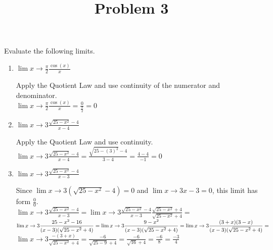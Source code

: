 \documentclass{ximera}
\title[Problem 3]{Problem 3}
\begin{document}
\begin{abstract} \end{abstract}
\maketitle


\begin{problem}
Evaluate the following limits.
	\begin{enumerate}
		\item $ \displaystyle \lim{x \to \frac{\pi}{2}} \frac{\cos{(x)}}{x}  $
	\begin{explanation} Apply the Quotient Law and use continuity of the numerator and denominator.\\[1em]
	 $ \displaystyle \lim{x \to \frac{\pi}{2}} \frac{\cos{(x)}}{x}=\frac{0}{\frac{\pi}{2}}=0  $
	\end{explanation} 
		
	\item	$\displaystyle \lim{x \to 3} \frac{\sqrt{25-x^2 }-4}{x-4} $\\
	\begin{explanation}Apply the Quotient Law and use continuity.	\\[1em]
	 $ \displaystyle \lim{x \to 3} \frac{\sqrt{25-x^2 }-4}{x-4}=  \frac{\sqrt{25-(3)^2 }-4}{3-4}= \frac{4-4}{-1}=0$\\
	
	\end{explanation} 
	\item	$\displaystyle \lim{x \to 3} \frac{\sqrt{25-x^2 }-4}{x-3} $\\
	\begin{explanation}
	Since $\displaystyle \lim{x \to 3} (\sqrt{25-x^2 }-4) = 0$ and $\displaystyle \lim{x \to 3} {x-3} = 0$, this limit has form $\frac{0}{0}$.\\[1em]
	 $ \displaystyle \lim{x \to 3} \frac{\sqrt{25-x^2 }-4}{x-3}=  \displaystyle \lim{x \to 3} \frac{\sqrt{25-x^2 }-4}{x-3}\frac{\sqrt{25-x^2 }+4}{\sqrt{25-x^2 }+4}=$\\
	 $ \displaystyle \lim{x \to 3} \frac{25-x^2-16}{(x-3)(\sqrt{25-x^2 }+4)}=  \displaystyle \lim{x \to 3} \frac{9-x^2}{(x-3)(\sqrt{25-x^2 }+4)}= \displaystyle \lim{x \to 3} \frac{(3+x)(3-x)}{(x-3)(\sqrt{25-x^2 }+4)}=\\   $
	 $\displaystyle \lim{x \to 3} \frac{-(3+x)}{\sqrt{25-x^2 }+4}=\frac{-6}{\sqrt{25-9 }+4}=\frac{-6}{\sqrt{16 }+4}=\frac{-6}{8}=\frac{-3}{4}$
	\end{explanation}
\end{enumerate}
\end{problem}
\end{document}

